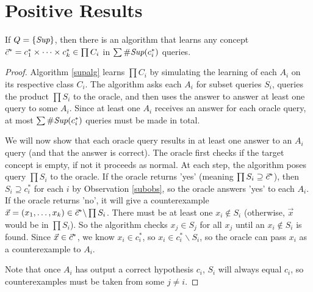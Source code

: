 \documentclass[11pt]{amsart}
\begin{document}
\section{Positive Results}

\begin{proposition}

If $Q = \{ \supQ \}$, then there is an algorithm that learns any concept $\targ = c^*_1 \times \dots \times c^*_k  \in \prod C_i $ in $\sum \supCi{i}(c^*_i)$ queries.  
\end{proposition}
\begin{proof}
Algorithm \ref{supalg} learns $\prod C_i $ by simulating the learning of each $A_i$ on its respective class $C_i$. 
The algorithm asks each $A_i$ for subset queries $S_i$, queries the product $\prod S_i$ to the oracle, and then uses the answer to answer at least one query to some $A_i$. 
Since at least one $A_i$ receives an answer for each oracle query, at most $\sum \supCi{i}(c^*_i)$ queries must be made in total. 

 

We will now show that each oracle query results in at least one answer to an $A_i$ query (and that the answer is correct). 
The oracle first checks if the target concept is empty, if not it proceeds as normal.
At each step, the algorithm poses query $\prod S_i$ to the oracle. 
If the oracle returns 'yes' (meaning $\prod S_i \supseteq \targ$), then  $S_i \supseteq c_i^*$ for each $i$ by Observation \ref{subobs}, so the oracle answers 'yes' to each $A_i$. 
If the oracle returns 'no', it will give a counterexample $\vec{x} = (x_1,\dots,x_k) \in \targ \backslash \prod S_i$. 
There must be at least one $x_i \not\in S_i$ (otherwise, $\vec{x}$ would be in $\prod S_i$). 
So the algorithm checks $x_j \in S_j$ for all $x_j$ until an $x_i \not\in S_i$ is found. 
Since $\vec{x} \in \targ$, we know $x_i \in c_i^*$, so $x_i \in c_i^* \backslash S_i$, so the oracle can pass $x_i$ as a counterexample to $A_i$. 

Note that once $A_i$ has output a correct hypothesis $c_i$, $S_i$ will always equal $c_i$, so counterexamples must be taken from some $j \ne i$. 
\end{proof}
\end{document}
